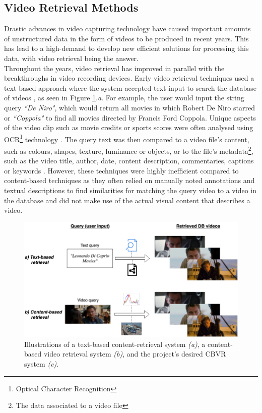 
\subsection{Video Retrieval Methods}
\label{sec:cbvr-methods}

Drastic advances in video capturing technology have caused important amounts of unstructured data in the form of videos to be produced in recent years. This has lead to a high-demand to develop new efficient solutions for processing this data, with video retrieval being the answer.\\

Throughout the years, video retrieval has improved in parallel with the breakthroughs in video recording devices. Early video retrieval techniques used a text-based approach where the system accepted text input to search the database of videos \cite{lai2015trajectory}, as seen in Figure \ref{fig:text_vs_content_retrieval}.\emph{a}. For example, the user would input the string query \textit{``De Niro"}, which would return all movies in which Robert De Niro starred or \textit{``Coppola"} to find all movies directed by Francis Ford Coppola. Unique aspects of the video clip such as movie credits or sports scores were often analysed using OCR\footnote{Optical Character Recognition} technology \cite{li2002text}. The query text was then compared to a video file's content, such as colours, shapes, texture, luminance or objects, or to the file's metadata\footnote{The data associated to a video file}, such as the video title, author, date, content description, commentaries, captions or keywords \cite{li2002text} \cite{feng2011} \cite{patel2012}. However, these techniques were highly inefficient compared to content-based techniques as they often relied on manually noted annotations and textual descriptions to find similarities for matching the query video to a video in the database and did not make use of the actual visual content that describes a video.\\

\begin{figure}[h]
\centerline{\includegraphics[width=\textwidth]{figures/litsurvey/content_text-retrieval_comparison.png}}
\caption{\label{fig:text_vs_content_retrieval}Illustrations of a text-based content-retrieval system \emph{(a)}, a content-based video retrieval system \emph{(b)}, and the project's desired CBVR system \emph{(c)}.}
\end{figure}


